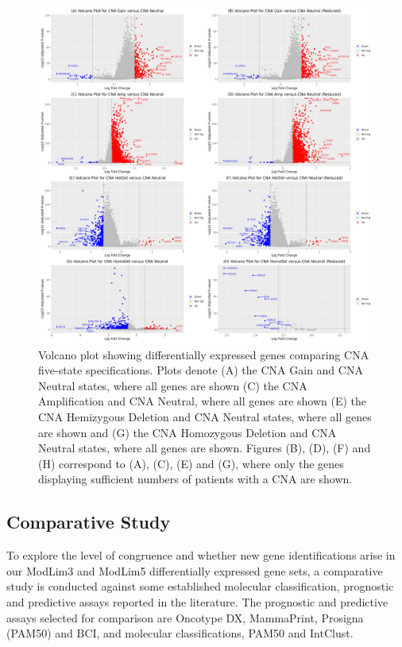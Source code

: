 \vfill 
\begin{figure}[!h]
\includegraphics[width=1\textwidth]{../figures/Chapter_4/Volcano_CNA_5State.png}
\caption[Volcano plot showing differentially expressed genes comparing CNA five-state specifications.]{Volcano plot showing differentially expressed genes comparing CNA five-state specifications. Plots denote (A) the CNA Gain and CNA Neutral states, where all genes are shown (C) the CNA Amplification and CNA Neutral, where all genes are shown (E) the CNA Hemizygous Deletion and CNA Neutral states, where all genes are shown and (G) the CNA Homozygous Deletion and CNA Neutral states, where all genes are shown. Figures (B), (D), (F) and (H) correspond to (A), (C), (E) and (G), where only the genes displaying sufficient numbers of patients with a CNA are shown.}
\label{fig:Volcano4}
\end{figure}
\vfill 
\clearpage
\subsection{Comparative Study}
To explore the level of congruence and whether new gene identifications arise in our ModLim3 and ModLim5 differentially expressed gene sets, a comparative study is conducted against some established molecular classification, prognostic and predictive assays reported in the literature. The prognostic and predictive assays selected for comparison are Oncotype DX, MammaPrint, Prosigna (PAM50) and BCI, and molecular classifications, PAM50 and IntClust.

